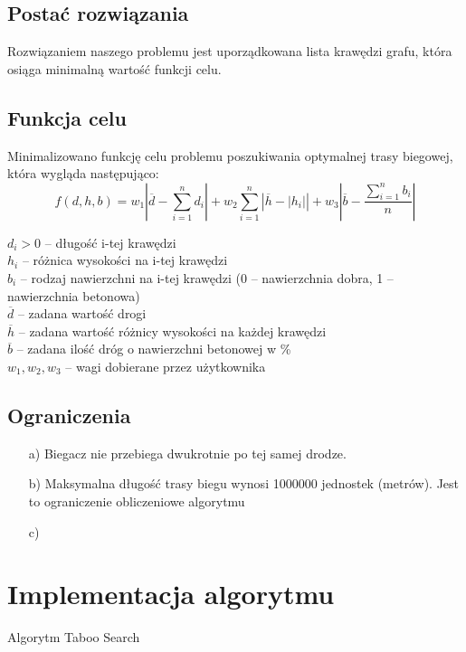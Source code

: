 \documentclass[12pt,a4paper]{article}
\begin{document}
\subsection{Postać rozwiązania}
Rozwiązaniem naszego problemu jest uporządkowana lista krawędzi grafu, która osiąga minimalną wartość funkcji celu.
\subsection{Funkcja celu}
Minimalizowano funkcję celu problemu poszukiwania optymalnej trasy biegowej, która wygląda następująco:
\begin{equation}
	f(d,h,b) = 
	w_1 \left|\overline{d} - \sum\limits_{i=1}^{n} d_{i} \right| + 
	w_2 \sum\limits_{i=1}^{n} \left|\overline{h} -  |h_{i}|\right| + 
	w_3 \left|\overline{b} - \dfrac{\sum\limits_{i=1}^{n} b_{i}}{n} \right|
\end{equation}

$d_i > 0$ -- długość i-tej krawędzi\\
$h_i$ -- różnica wysokości na i-tej krawędzi\\
$b_i$ -- rodzaj nawierzchni na i-tej krawędzi (0 -- nawierzchnia dobra, 1 -- nawierzchnia betonowa)\\
$\overline{d}$ -- zadana wartość drogi\\
$\overline{h}$ -- zadana wartość różnicy wysokości na każdej krawędzi\\
$\overline{b}$ -- zadana ilość dróg o nawierzchni betonowej w \% \\
$w_1, w_2, w_3$ -- wagi dobierane przez użytkownika

\subsection{Ograniczenia}
\begin{enumerate}
\item[a)] Biegacz nie przebiega dwukrotnie po tej samej drodze.
\item[b)] Maksymalna długość trasy biegu wynosi 1000000 jednostek (metrów). Jest to ograniczenie obliczeniowe algorytmu
\item[c)] 
\end{enumerate}

\section{Implementacja algorytmu}
Algorytm Taboo Search
\end{document}
